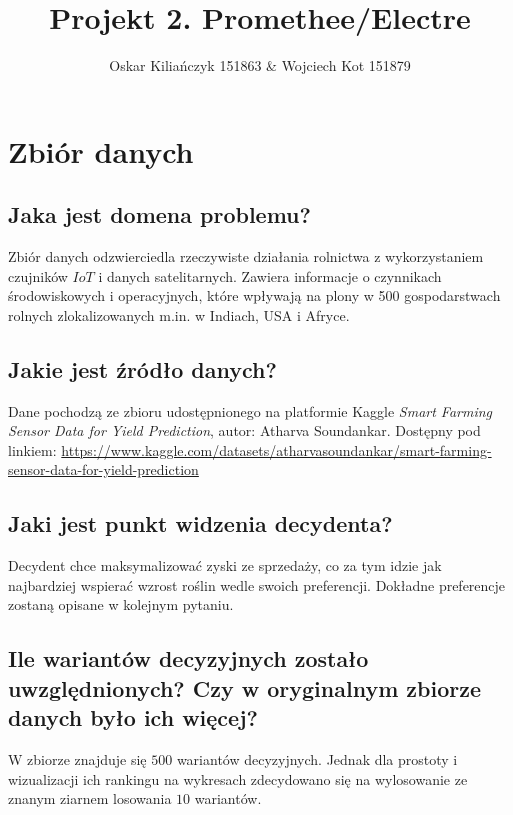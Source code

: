 \documentclass[11pt]{article}
\title{Projekt 2. Promethee/Electre}
\author{Oskar Kiliańczyk 151863 \& Wojciech Kot 151879}
\date{}
\begin{document}
\maketitle
\newpage

\section{Zbiór danych}
\subsection{Jaka jest domena problemu?}
Zbiór danych odzwierciedla rzeczywiste działania rolnictwa z wykorzystaniem czujników $IoT$ i danych satelitarnych. Zawiera informacje o czynnikach środowiskowych i operacyjnych, które wpływają na plony w 500 gospodarstwach rolnych zlokalizowanych m.in. w Indiach, USA i Afryce.

\subsection{Jakie jest źródło danych?}
Dane pochodzą ze zbioru udostępnionego na platformie Kaggle \textit{Smart Farming Sensor Data for Yield Prediction}, autor: Atharva Soundankar. Dostępny pod linkiem: \url{https://www.kaggle.com/datasets/atharvasoundankar/smart-farming-sensor-data-for-yield-prediction}

\subsection{Jaki jest punkt widzenia decydenta?}
Decydent chce maksymalizować zyski ze sprzedaży, co za tym idzie jak najbardziej wspierać wzrost roślin wedle swoich preferencji. Dokładne preferencje zostaną opisane w kolejnym pytaniu.

\subsection{Ile wariantów decyzyjnych zostało uwzględnionych? Czy w oryginalnym zbiorze danych było ich więcej?}
W zbiorze znajduje się $500$ wariantów decyzyjnych. Jednak dla prostoty i wizualizacji ich rankingu na wykresach zdecydowano się na wylosowanie ze znanym ziarnem losowania $10$ wariantów.
\end{document}
